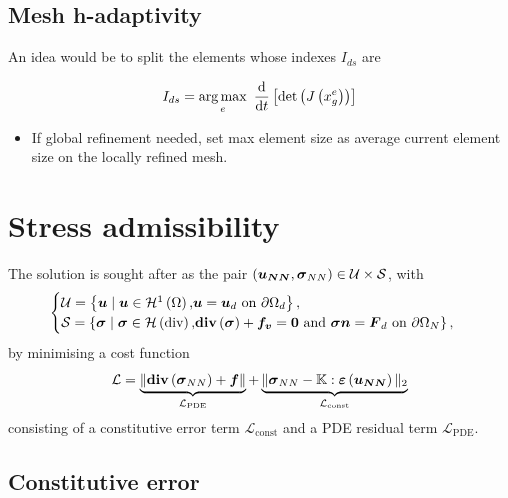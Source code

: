 \subsection{Mesh h-adaptivity}

An idea would be to split the elements whose indexes $I_{ds}$ are

\begin{equation}
	I_{ds} = \operatorname*{arg\,max}_{e}~\frac{\mathrm{d}}{\mathrm{d}t} \left[ \text{det}\left(J\left(x^e_g\right)\right)\right]
\end{equation}

\begin{itemize}
	\item If global refinement needed, set max element size as average current element size on the locally refined mesh.
\end{itemize}


\newpage
\section{Stress admissibility}
The solution is sought after as the pair $\left(\boldsymbol{u_{NN}},\mathcal{\boldsymbol{\sigma}}_{NN}\right) \in \mathcal{U}  \times \mathcal{S}$, with
\begin{equation}
	\begin{cases}
	\mathcal{U} = \left\{\boldsymbol{u} \; | \; \boldsymbol{u}\in \mathcal{H}^1\left(\Omega\right)\text{,} 
	\boldsymbol{u} = \boldsymbol{u}_d \text{ on } \partial \Omega_d \right\}, \\
		\mathcal{S} = \left\{\mathcal{\boldsymbol{\sigma}} \; | \; \mathcal{\boldsymbol{\sigma}}\in \mathcal{H}\left(\text{div}\right)\text{,} \text{\textbf{div}}\left(\mathcal{\boldsymbol{\sigma}}\right)+\boldsymbol{f_v} = \boldsymbol{0}\text{ and }
	\mathcal{\boldsymbol{\sigma}}\boldsymbol{n} = \boldsymbol{F}_d \text{ on } \partial \Omega_N \right\}, 
	\end{cases}
\end{equation}
by minimising a cost function 
\begin{equation}
	\mathcal{L} = \underbrace{\Vert \text{\textbf{div}}\left(\mathcal{\boldsymbol{\sigma}}_{NN}\right)+\boldsymbol{f}\Vert}_{\mathcal{L}_{\text{PDE}}} + \underbrace{ \Vert \mathcal{\boldsymbol{\sigma}}_{NN} - \mathbb{K}:\mathcal{\boldsymbol{\varepsilon}}\left(\boldsymbol{u_{NN}}\right) \Vert_{2}}_{\mathcal{L}_{\text{const}}}
\end{equation} consisting of a constitutive error term $\mathcal{L}_{\text{const}}$ and a PDE residual term $\mathcal{L}_{\text{PDE}}$.
\subsection{Constitutive error}
